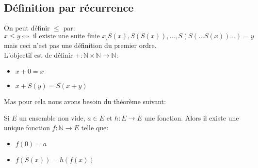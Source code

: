 \subsection{Définition par récurrence}

On peut définir $\leq$ par:
$$ x \leq y \iff \text{ il existe une suite finie } x_, S(x), S(S(x)), \ldots, S(S(\ldots S(x)) \ldots) = y $$
mais ceci n'est pas une définition du premier ordre.\\

L'objectif est de définir $+ : \mathbb{N} \times \mathbb{N} \to \mathbb{N}$:
\begin{itemize}
	\item $x + 0 = x$
	\item $x + S(y) = S(x + y)$
\end{itemize}

Mas pour cela nous avons besoin du théorème suivant:

\begin{theorem} [Dedekind 1888]
	Si $E$ un ensemble non vide, $a \in E$ et $h : E \to E$ une fonction. Alors il existe une unique fonction $f : \mathbb{N} \to E$ telle que:
	\begin{itemize}
		\item $f(0) = a$
		\item $f(S(x)) = h(f(x))$
	\end{itemize}
\end{theorem}

